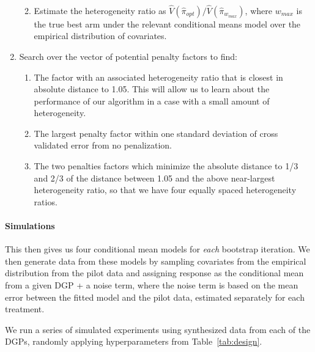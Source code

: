 \documentclass[letterpaper, 12pt, parskip=full,]{scrartcl}
\begin{document}
\begin{enumerate}
\begin{enumerate}
\begin{align}
          \end{align}
  \item Estimate the heterogeneity ratio as $\hat{V}(\hat{\pi}_{opt})/\hat{V}(\hat{\pi}_{w_{max}})$, where $w_{max}$ is the true best arm under the relevant conditional means model over the empirical distribution of covariates. 
\end{enumerate}
\item Search over the vector of potential penalty factors to find:
\begin{enumerate}
\item The factor with an associated heterogeneity ratio that is closest in absolute distance to 1.05. This will allow us to learn about the performance of our algorithm in a case with a small amount of heterogeneity. 
\item The largest penalty factor within one standard deviation of cross validated error from no penalization. 
\item The two penalties factors which minimize the absolute distance to 1/3 and 2/3 of the distance between 1.05 and the above near-largest heterogeneity ratio, so that we have four equally spaced heterogeneity ratios. 
\end{enumerate}
\end{enumerate}

\paragraph{Simulations}
This then gives us four conditional mean models for \textit{each} bootstrap iteration. We then generate data from these models by sampling covariates from the empirical distribution from the pilot data and assigning response as the conditional mean from a given DGP + a noise term, where the noise term is based on the mean error between the fitted model and the pilot data, estimated separately for each treatment. 

We run a series of simulated experiments using synthesized data from each of the DGPs, randomly applying hyperparameters from Table~\ref{tab:design}. 
\end{document}
